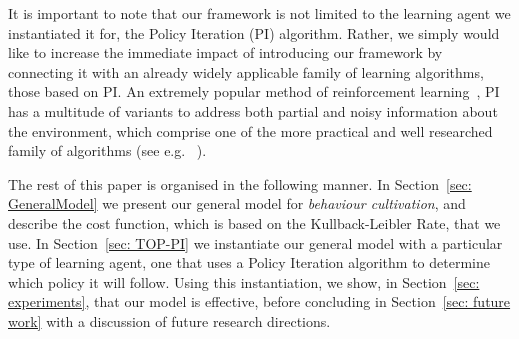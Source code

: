It is important to note that our framework is not  limited
to the learning agent we instantiated it for, the Policy Iteration
(PI) algorithm. Rather, we simply would like to increase the immediate
impact of introducing our framework by connecting it with an already
widely applicable family of learning algorithms, those based on 
PI. An extremely popular method of reinforcement
learning~\cite{sutton_barto_RL}, PI has a multitude of variants to
address both partial and noisy information about the environment,
which comprise one of the more practical and well researched family of
algorithms (see e.g. ~\cite{koller_parr_2000,
  perkins_precup_2003,vanRoy_98,sato_kobayashi_2000,lagoudakis_parr_2003,sugiyama_et_al_2009}).


The rest of this paper is organised in the following manner. In
Section~\ref{sec: GeneralModel} we present our general model for
\emph{behaviour cultivation}, and describe the cost function, which is
based on the Kullback-Leibler Rate, that we use.  In Section~\ref{sec:
  TOP-PI} we instantiate our general model with a particular type of
learning agent, one that uses a Policy Iteration algorithm to
determine which policy it will follow. Using this instantiation, we
show, in Section~\ref{sec: experiments}, that our model is effective,
before concluding in Section~\ref{sec: future work} with a discussion
of future research directions.



